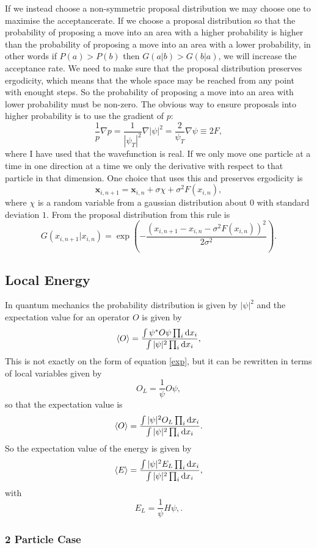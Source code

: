 \documentclass[a4paper,English,10pt]{article}
\newcommand{\bb}[1]{\boldsymbol{#1}}
\newcommand{\dd}{\mathrm{d}}
\newcommand{\be}{\begin{equation}}
\newcommand{\ee}{\end{equation}}
\newcommand{\f}{\frac}
\renewcommand{\braket}{\Braket}
\begin{document}
If we instead choose a non-symmetric proposal distribution we may choose one to maximise the acceptancerate.
If we choose a proposal distribution so that the probability of proposing a move into an area with a higher probability is higher than
the probability of proposing a move into an area with a lower probability, in other words
if $P(a)>P(b)$ then $G(a|b)>G(b|a)$, we will increase the acceptance rate. We need to make sure that the proposal distribution preserves ergodicity,
which means that the whole space may be reached from any point with enought steps. So the probability of proposing a move into an area with lower probability must be non-zero.
The obvious way to ensure proposals into higher probability is to use the gradient of $p$:
\be
\f{1}{p}\nabla p = \f{1}{|\psi_T|^2}\nabla|\psi|^2 = \f{2}{\psi_T}\nabla\psi \equiv 2F, \label{eq:qforce} 
\ee
where I have used that the wavefunction is real. If we only move one particle at a time in one direction at a time we only the derivative with respect to
that particle in that dimension. 
One choice that uses this and preserves ergodicity is
\be
\bb{x}_{i,n+1} = \bb{x}_{i,n} + \sigma \chi + \sigma^2F(x_{i,n}),\label{eq:prop}
\ee
where $\chi$ is a random variable from a gaussian distribution about $0$ with standard deviation $1$.
From \cite{mortenbok} the proposal distribution from this rule is
\be
G(x_{i,n+1}|x_{i,n}) = \exp\left(-\f{(x_{i,n+1} - x_{i,n} - \sigma^2F(x_{i,n}))^2}{2\sigma^2}\right).
\ee
\subsection{Local Energy}
In quantum mechanics the probability distribution is given by $|\psi|^2$ and the expectation value for an operator $O$ is given by
\be
\braket{O} = \f{\int\psi^*O\psi\prod_i\dd x_i}{\int|\psi|^2\prod_i\dd x_i},
\ee
This is not exactly on the form of equation \ref{exp}, but it can be rewritten in terms of local variables given by
\be
O_L = \f{1}{\psi}O\psi, \label{localdef}
\ee
so that the expectation value is
\be
\braket{O} =  \f{\int|\psi|^2O_L\prod_i\dd x_i}{\int|\psi|^2\prod_i\dd x_i}.
\ee
So the expectation value of the energy is given by
\be
\braket{E} =  \f{\int|\psi|^2E_L\prod_i\dd x_i}{\int|\psi|^2\prod_i\dd x_i},
\ee
with
\be
E_L = \f{1}{\psi}H\psi, \label{localEdef}.
\ee



\subsubsection{2 Particle Case}
\end{document}
